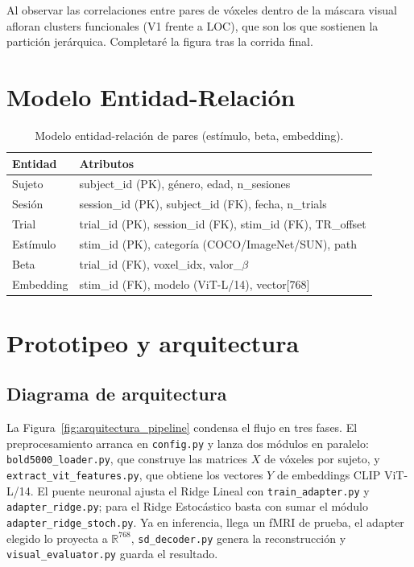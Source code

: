 Al observar las correlaciones entre pares de vóxeles dentro de la máscara visual afloran clusters funcionales (V1 frente a LOC), que son los que sostienen la partición jerárquica. Completaré la figura tras la corrida final.

\section{Modelo Entidad-Relación}

\begin{table}[H]
\centering
\begin{tabular}{| l | l |}
\hline
\textbf{Entidad} & \textbf{Atributos} \\ \hline
Sujeto       & subject\_id (PK), género, edad, n\_sesiones \\ \hline
Sesión       & session\_id (PK), subject\_id (FK), fecha, n\_trials \\ \hline
Trial        & trial\_id (PK), session\_id (FK), stim\_id (FK), TR\_offset \\ \hline
Estímulo     & stim\_id (PK), categoría (COCO/ImageNet/SUN), path \\ \hline
Beta         & trial\_id (FK), voxel\_idx, valor\_$\beta$ \\ \hline
Embedding    & stim\_id (FK), modelo (ViT-L/14), vector[768] \\ \hline
\end{tabular}
\caption[ER del dataset]{Modelo entidad-relación de pares (estímulo, beta, embedding).}
\label{table:er_dataset}
\end{table}

\section{Prototipeo y arquitectura}

\subsection{Diagrama de arquitectura}

La Figura~\ref{fig:arquitectura_pipeline} condensa el flujo en tres fases. El preprocesamiento arranca en \texttt{config.py} y lanza dos módulos en paralelo: \texttt{bold5000\_loader.py}, que construye las matrices $X$ de vóxeles por sujeto, y \texttt{extract\_vit\_features.py}, que obtiene los vectores $Y$ de embeddings CLIP ViT-L/14. El puente neuronal ajusta el Ridge Lineal con \texttt{train\_adapter.py} y \texttt{adapter\_ridge.py}; para el Ridge Estocástico basta con sumar el módulo \texttt{adapter\_ridge\_stoch.py}. Ya en inferencia, llega un fMRI de prueba, el adapter elegido lo proyecta a $\mathbb{R}^{768}$, \texttt{sd\_decoder.py} genera la reconstrucción y \texttt{visual\_evaluator.py} guarda el resultado.

